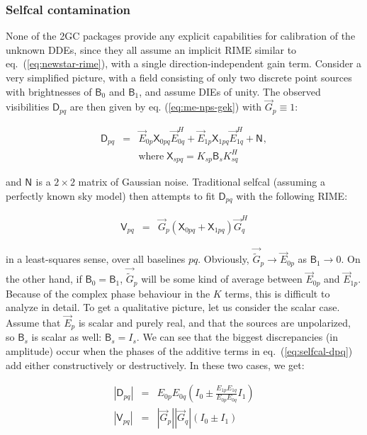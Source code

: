 \documentclass[]{aa}
\newcommand{\herm}{H}
\newcommand{\jones}[2]{\vec {#1}_{#2}}
\newcommand{\jonesT}[2]{\vec {#1}^{\herm}_{#2}}
\newcommand{\coh}[2]{\mathsf{{#1}}_{{#2}}}
\begin{document}
\subsubsection{Selfcal contamination}

None of the 2GC packages provide any explicit capabilities for calibration of the unknown DDEs, since they all assume an implicit RIME similar to eq.~(\ref{eq:newstar-rime}), with a single direction-independent gain term. Consider a very simplified picture, with a field consisting of only two discrete point sources with brightnesses of $\coh{B}{0}$ and $\coh{B}{1}$, and assume DIEs of unity. The observed visibilities $\coh{D}{pq}$ are then given by eq. (\ref{eq:me-nps-gek}) with $\jones{G}{p}\equiv1$:

\begin{eqnarray}\label{eq:selfcal-dpq}
\coh{D}{pq} & = & \jones{E}{0p} \coh{X}{0pq} \jonesT{E}{0q} + \jones{E}{1p} \coh{X}{1pq} \jonesT{E}{1q} + \coh{N}{}, \\
\nonumber && \mathrm{where}\; \coh{X}{spq} = K_{sp} \coh{B}{s} K^\herm_{sq}
\end{eqnarray}  

and $\coh{N}{}$ is a $2\times2$ matrix of Gaussian noise. Traditional selfcal (assuming a perfectly known sky model) then attempts to fit $\coh{D}{pq}$ with the following RIME:

\begin{eqnarray}\label{eq:selfcal-vpq}
\coh{V}{pq} & = & \jones{G}{p} ( \coh{X}{0pq} + \coh{X}{1pq} ) \jonesT{G}{q}
\end{eqnarray}

in a least-squares sense, over all baselines $pq$. Obviously, $\jones{\tilde G}{p}\to\jones{E}{0p}$ as $\coh{B}{1}\to0$. On the other hand, if $\coh{B}{0}=\coh{B}{1}$, $\jones{\tilde G}{p}$ will be some kind of average between $\jones{E}{0p}$ and $\jones{E}{1p}$. Because of the complex phase behaviour in the $K$ terms, this is difficult to analyze in detail. To get a qualitative picture, let us consider the scalar case. Assume that $\jones{E}{p}$ is scalar and purely real, and that the sources are unpolarized, so $\coh{B}{s}$ is scalar as well: $\coh{B}{s}=I_s$. We can see that the biggest discrepancies (in amplitude) occur when the phases of the additive terms in eq.~(\ref{eq:selfcal-dpq}) add either constructively or destructively. In these two cases, we get:

\begin{eqnarray*}
|\coh{D}{pq}| & = & E_{0p} E_{0q} ( I_0 \pm \frac{E_{1p} E_{1q}}{E_{0p} E_{0q}} I_1 ) \\
|\coh{V}{pq}| & = & |\jones{G}{p}| |\jones{G}{q}| ( I_0 \pm I_1 ) \\
\end{eqnarray*}
\end{document}
